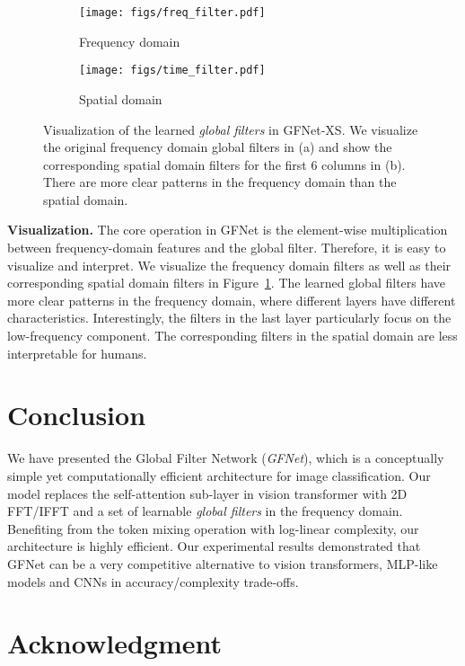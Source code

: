 \documentclass{article}
\numberwithin{equation}{section}
\newcommand{\gknet}{GFNet}
\newcommand{\paragrapha}[2][1pt]{\vspace{#1}\noindent\textbf{#2}}
\begin{document}
\begin{figure}[t]
\begin{subfigure}{.81\textwidth}
    \centering
    \texttt{[image: figs/freq\_filter.pdf]}
    \caption{Frequency domain}
\end{subfigure}\begin{subfigure}{.19\textwidth}
    \centering
    \texttt{[image: figs/time\_filter.pdf]}
    \caption{Spatial domain}
\end{subfigure}
\caption{Visualization of the learned \emph{global filters} in \gknet-XS. We visualize the original frequency domain global filters in (a) and show the corresponding spatial domain filters for the first 6 columns in (b). There are more clear patterns in the frequency domain than the spatial domain. }
\label{fig:vis} \vspace{-10pt}
\end{figure}



\paragrapha{Visualization.} The core operation in GFNet is the element-wise multiplication between frequency-domain features and the global filter. Therefore, it is easy to visualize and interpret. We visualize the frequency domain filters as well as their corresponding spatial domain filters in Figure~\ref{fig:vis}. The learned global filters have more clear patterns in the frequency domain, where different layers have different characteristics. Interestingly, the filters in the last layer particularly focus on the low-frequency component. The corresponding filters in the spatial domain are less interpretable for humans. 




\section{Conclusion}
\label{sec:con}
We have presented the Global Filter Network (\emph{\gknet}), which is a conceptually simple yet computationally efficient architecture for image classification. Our model replaces the self-attention sub-layer in vision transformer with 2D FFT/IFFT and a set of learnable \emph{global filters} in the frequency domain. Benefiting from the token mixing operation with log-linear complexity, our architecture is highly efficient. Our experimental results demonstrated that {\gknet} can be a very competitive alternative to vision transformers, MLP-like models and CNNs in accuracy/complexity trade-offs.

\section*{Acknowledgment}
\end{document}

